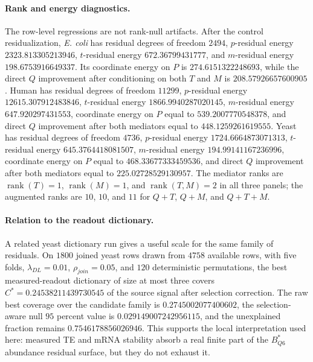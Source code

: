 \paragraph{Rank and energy diagnostics.}
The row-level regressions are not rank-null artifacts. After the control residualization, \emph{E. coli} has residual degrees of freedom $2494$, $p$-residual energy $2323.813305213946$, $t$-residual energy $672.36799431777$, and $m$-residual energy $198.6753916649337$. Its coordinate energy on $P$ is $274.6151322248693$, while the direct $Q$ improvement after conditioning on both $T$ and $M$ is $208.57926657600905$. Human has residual degrees of freedom $11299$, $p$-residual energy $12615.307912483846$, $t$-residual energy $1866.9940287020145$, $m$-residual energy $647.920297431553$, coordinate energy on $P$ equal to $539.2007770548378$, and direct $Q$ improvement after both mediators equal to $448.1259261619555$. Yeast has residual degrees of freedom $4736$, $p$-residual energy $1724.6664873071313$, $t$-residual energy $645.3764418081507$, $m$-residual energy $194.99141167236996$, coordinate energy on $P$ equal to $468.33677333459536$, and direct $Q$ improvement after both mediators equal to $225.02728529130957$. The mediator ranks are $\operatorname{rank}(T)=1$, $\operatorname{rank}(M)=1$, and $\operatorname{rank}(T,M)=2$ in all three panels; the augmented ranks are $10$, $10$, and $11$ for $Q+T$, $Q+M$, and $Q+T+M$.

\paragraph{Relation to the readout dictionary.}
A related yeast dictionary run gives a useful scale for the same family of residuals. On $1800$ joined yeast rows drawn from $4758$ available rows, with five folds, $\lambda_{DL}=0.01$, $\rho_{join}=0.05$, and $120$ deterministic permutations, the best measured-readout dictionary of size at most three covers $C^*=0.24538211439730545$ of the source signal after selection correction. The raw best coverage over the candidate family is $0.2745002077400602$, the selection-aware null $95$ percent value is $0.029149007242956115$, and the unexplained fraction remains $0.7546178856026946$. This supports the local interpretation used here: measured TE and mRNA stability absorb a real finite part of the $B^*_{Q6}$ abundance residual surface, but they do not exhaust it.

